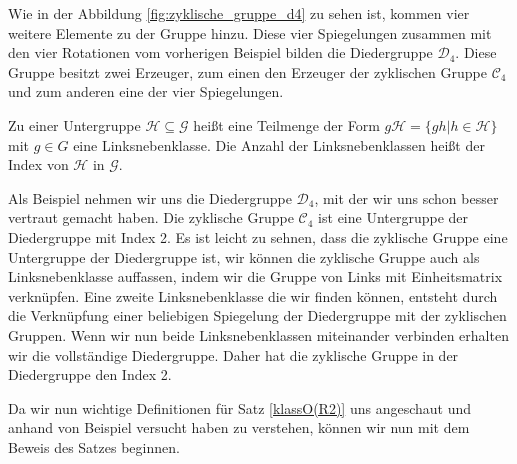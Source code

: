 Wie in der Abbildung \ref{fig:zyklische_gruppe_d4} zu sehen ist, kommen vier weitere Elemente zu der Gruppe hinzu. Diese vier Spiegelungen zusammen mit den vier Rotationen vom vorherigen Beispiel bilden die Diedergruppe $\mathcal{D}_4$. Diese Gruppe besitzt zwei Erzeuger, zum einen den Erzeuger der zyklischen Gruppe $\mathcal{C}_4$ und zum anderen eine der vier Spiegelungen. 
\begin{defi}[Linksnebenklasse]
	Zu einer Untergruppe $\mathcal{H} \subseteq \mathcal{G}$ heißt eine Teilmenge der Form $g\mathcal{H} = \{gh|h\in\mathcal{H}\}$ mit $g \in G$ eine Linksnebenklasse. Die Anzahl der Linksnebenklassen heißt der Index von $\mathcal{H}$ in $\mathcal{G}$.
\end{defi}
Als Beispiel nehmen wir uns die Diedergruppe $\mathcal{D}_4$, mit der wir uns schon besser vertraut gemacht haben. Die zyklische Gruppe $\mathcal{C}_4$ ist eine Untergruppe der Diedergruppe mit Index 2. Es ist leicht zu sehnen, dass die zyklische Gruppe eine Untergruppe der Diedergruppe ist, wir können die zyklische Gruppe auch als Linksnebenklasse auffassen, indem wir die Gruppe von Links mit Einheitsmatrix verknüpfen. Eine zweite Linksnebenklasse die wir finden können, entsteht durch die Verknüpfung einer beliebigen Spiegelung der Diedergruppe mit der zyklischen Gruppen. Wenn wir nun beide Linksnebenklassen miteinander verbinden erhalten wir die vollständige Diedergruppe. Daher hat die zyklische Gruppe in der Diedergruppe den Index 2. \par\smallskip
Da wir nun wichtige Definitionen für Satz \ref{klassO(R2)} uns angeschaut und anhand von Beispiel versucht haben zu verstehen, können wir nun mit dem Beweis des Satzes beginnen. 
